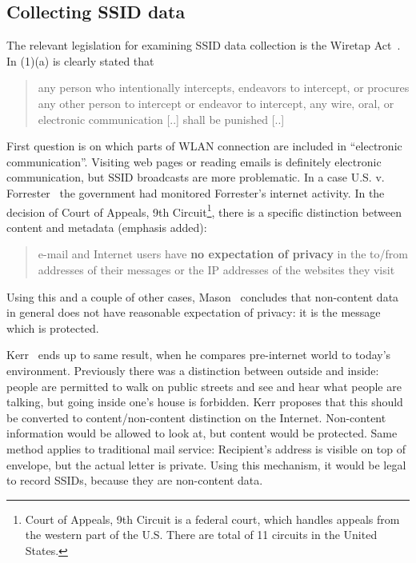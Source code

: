 \documentclass[12pt,a4paper,oneside,pdftex]{report}
\begin{document}
\subsection{Collecting SSID data}
\label{subsec:us_collecting}

The relevant legislation for examining SSID data collection is the Wiretap Act~\cite{wiretap_act}. In (1)(a) is clearly stated that

\begin{quote}
    any person who intentionally intercepts, endeavors to intercept, or procures any other person to intercept or endeavor to intercept, any wire, oral, or electronic communication [..] shall be punished [..]
\end{quote}

First question is on which parts of WLAN connection are included in ``electronic communication''. Visiting web pages or reading emails is definitely electronic communication, but SSID broadcasts are more problematic. In a case U.S. v. Forrester~\cite{us_forrester} the government had monitored Forrester's internet activity. In the decision of Court of Appeals, 9th Circuit\footnote{Court of Appeals, 9th Circuit is a federal court, which handles appeals from the western part of the U.S. There are total of 11 circuits in the United States.}, there is a specific distinction between content and metadata (emphasis added):

\begin{quote}
    e-mail and Internet users have \textbf{no expectation of privacy} in the to/from addresses of their messages or the IP addresses of the websites they visit
\end{quote}

Using this and a couple of other cases, Mason~\cite{mason2014aligning} concludes that non-content data in general does not have reasonable expectation of privacy: it is the message which is protected. 

Kerr~\cite{kerr2009applying} ends up to same result, when he compares pre-internet world to today's environment. Previously there was a distinction between outside and inside: people are permitted to walk on public streets and see and hear what people are talking, but going inside one's house is forbidden. Kerr proposes that this should be converted to content/non-content distinction on the Internet. Non-content information would be allowed to look at, but content would be protected. Same method applies to traditional mail service: Recipient's address is visible on top of envelope, but the actual letter is private. Using this mechanism, it would be legal to record SSIDs, because they are non-content data.
\end{document}
